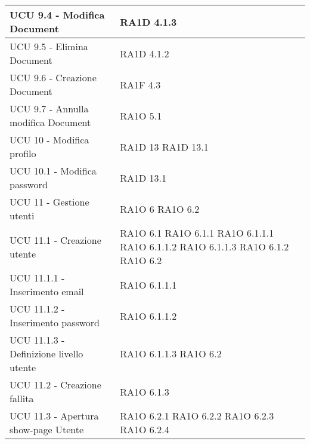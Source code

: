 \begin{center}
\begin{longtable}{ | p{5cm} | p{5cm} |}
            UCU 9.4 - Modifica Document &  RA1D 4.1.3 \newline  \\ \hline      
            UCU 9.5 - Elimina Document &  RA1D 4.1.2 \newline  \\ \hline      
            UCU 9.6 - Creazione Document &  RA1F 4.3 \newline  \\ \hline      
            UCU 9.7 - Annulla modifica Document &  RA1O 5.1 \newline  \\ \hline      
            UCU 10 - Modifica profilo &  RA1D 13 \newline  RA1D 13.1 \newline  \\ \hline      
            UCU 10.1 - Modifica password &  RA1D 13.1 \newline  \\ \hline      
            UCU 11 - Gestione utenti &  RA1O 6 \newline  RA1O 6.2 \newline  \\ \hline      
            UCU 11.1 - Creazione utente &  RA1O 6.1 \newline  RA1O 6.1.1 \newline  RA1O 6.1.1.1 \newline  RA1O 6.1.1.2 \newline  RA1O 6.1.1.3 \newline  RA1O 6.1.2 \newline  RA1O 6.2 \newline  \\ \hline      
            UCU 11.1.1 - Inserimento email &  RA1O 6.1.1.1 \newline  \\ \hline      
            UCU 11.1.2 - Inserimento password &  RA1O 6.1.1.2 \newline  \\ \hline      
            UCU 11.1.3 - Definizione livello utente &  RA1O 6.1.1.3 \newline  RA1O 6.2 \newline  \\ \hline      
            UCU 11.2 - Creazione fallita &  RA1O 6.1.3 \newline  \\ \hline      
            UCU 11.3 - Apertura show-page Utente &  RA1O 6.2.1 \newline  RA1O 6.2.2 \newline  RA1O 6.2.3 \newline  RA1O 6.2.4 \newline  \\ \hline      

\end{longtable}
\end{center}
